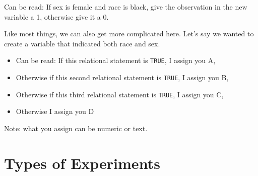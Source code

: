 \documentclass[
  letterpaper,
  DIV=11,
  numbers=noendperiod]{scrreprt}
\newenvironment{Shaded}{\begin{snugshade}}{\end{snugshade}}
\newcommand{\FunctionTok}[1]{\textcolor[rgb]{0.28,0.35,0.67}{#1}}
\newcommand{\NormalTok}[1]{\textcolor[rgb]{0.00,0.23,0.31}{#1}}
\newcommand{\OtherTok}[1]{\textcolor[rgb]{0.00,0.23,0.31}{#1}}
\newcommand{\SpecialCharTok}[1]{\textcolor[rgb]{0.37,0.37,0.37}{#1}}
\newcommand{\StringTok}[1]{\textcolor[rgb]{0.13,0.47,0.30}{#1}}
\providecommand{\tightlist}{%
  \setlength{\itemsep}{0pt}\setlength{\parskip}{0pt}}\usepackage{longtable,booktabs,array}
\begin{document}
Can be read: If sex is female and race is black, give the observation in
the new variable a 1, otherwise give it a 0.

Like most things, we can also get more complicated here. Let's say we
wanted to create a variable that indicated both race and sex.

\begin{itemize}
\tightlist
\item
  Can be read: If this relational statement is \texttt{TRUE}, I assign
  you A,
\item
  Otherwise if this second relational statement is \texttt{TRUE}, I
  assign you B,
\item
  Otherwise if this third relational statement is \texttt{TRUE}, I
  assign you C,
\item
  Otherwise I assign you D
\end{itemize}

\begin{Shaded}
\end{Shaded}

Note: what you assign can be numeric or text.

\hypertarget{types-of-experiments}{%
\section{Types of Experiments}\label{types-of-experiments}}
\end{document}
